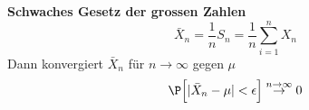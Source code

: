 \theorem \textbf{Schwaches Gesetz der grossen Zahlen}\\
$$
    \bar{X}_n = \frac{1}{n}S_n = \frac{1}{n}\sum_{i=1}^{n}X_n
$$
Dann konvergiert $\bar{X}_n$ für $n\to\infty$ gegen $\mu$
$$
    \P\Bigl[ |\bar{X}_n - \mu| < \epsilon \Bigr] \overset{n\to\infty}{\rightarrow} 0
$$